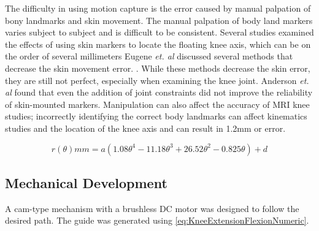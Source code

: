 The difficulty in using motion capture is the error caused by manual palpation of bony landmarks and skin movement. The manual palpation of body land markers varies subject to subject and is difficult to be consistent. Several studies examined the effects of using skin markers to locate the floating knee axis, which can be on the order of several millimeters Eugene \textit{et. al} discussed several methods that decrease the skin movement error. \cite{alexander2001correcting} \cite{cappozzo1996position}. While these methods decrease the skin error, they are still not perfect, especially when examining the knee joint. Anderson \textit{et. al} found that even the addition of joint constraints did not improve the reliability of skin-mounted markers. Manipulation can also affect the accuracy of MRI knee studies; incorrectly identifying the correct body landmarks can affect kinematics studies and the location of the knee axis \cite{lerner2003use} and can result in 1.2mm or error. 


\begin{equation}
    r(\theta) mm = a(1.08\theta^4 - 11.18\theta^3 + 26.52\theta^2 - 0.825\theta) + d
    \label{eq:KneeExtensionFlexionNumeric}
\end{equation}





\subsection{Mechanical Development}

A cam-type mechanism with a brushless DC motor was designed to follow the desired path. The guide was generated using \autoref{eq:KneeExtensionFlexionNumeric}. 


